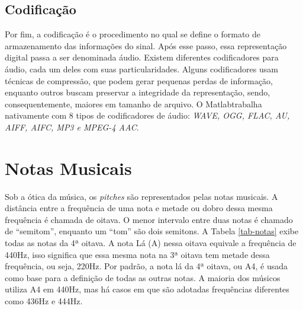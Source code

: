 \subsection{Codificação}
Por fim, a codificação é o procedimento no qual se define o formato de armazenamento das informações do sinal. Após esse passo, essa representação digital passa a ser denominada áudio. Existem diferentes codificadores para áudio, cada um deles com suas particularidades. Alguns codificadores usam técnicas de compressão, que podem gerar pequenas perdas de informação, enquanto outros buscam preservar a integridade da representação, sendo, consequentemente, maiores em tamanho de arquivo. O Matlab\rreg trabalha nativamente com 8 tipos de codificadores de áudio: \textit{WAVE, OGG, FLAC, AU, AIFF, AIFC, MP3 e MPEG-4 AAC}\cite{mathworks2018audioread}.


\section{Notas Musicais}

Sob a ótica da música, os \textit{pitches} são representados pelas notas musicais. A distância entre a frequência de uma nota e metade ou dobro dessa mesma frequência é chamada de oitava. O menor intervalo entre duas notas é chamado de ``semitom'', enquanto um ``tom'' são dois semitons. A Tabela \ref{tab-notas} exibe todas as notas da 4ª oitava. A nota Lá (A) nessa oitava equivale a frequência de 440Hz, isso significa que essa mesma nota na 3ª oitava tem metade dessa frequência, ou seja, 220Hz. Por padrão, a nota lá da 4ª oitava, ou A4, é usada como base para a definição de todas as outras notas. A maioria dos músicos utiliza A4 em 440Hz, mas há casos em que são adotadas frequências diferentes como 436Hz e 444Hz.

